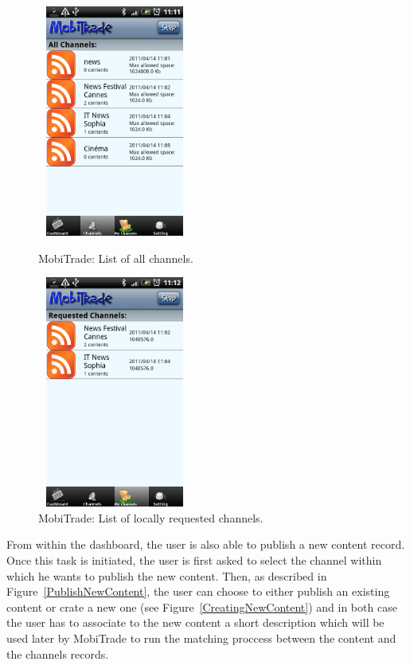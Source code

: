 \begin{figure}[!h]
\begin{minipage}[l]{0.3\linewidth}
\centering
\includegraphics[width=2in,height=3in]{Chapitre6/ListAllChannels.png}
\begin{minipage}[l]{1\linewidth}
\small
\caption{MobiTrade: List of all channels.}
\normalsize
\label{ListAllChannels}
\end{minipage}
\end{minipage}
\hspace{2.1cm}
\begin{minipage}[l]{0.3\linewidth}
\centering
\includegraphics[width=2in,height=3in]{Chapitre6/ListRequestedChannels.png}
\begin{minipage}[l]{1\linewidth}
\caption{MobiTrade: List of locally requested channels.}
\label{ListRequestedChannels}
\end{minipage}
\end{minipage}
\end{figure}

From within the dashboard, the user is also able to publish a new content record. Once this task is initiated, the user is first asked to select the channel within which he wants to publish the new content. Then, as described in Figure~\ref{PublishNewContent}, the user can choose to either publish an existing content or crate a new one (see Figure~\ref{CreatingNewContent}) and in both case the user has to associate to the new content a short description which will be used later by MobiTrade to run the matching proccess between the content  and the channels records.

